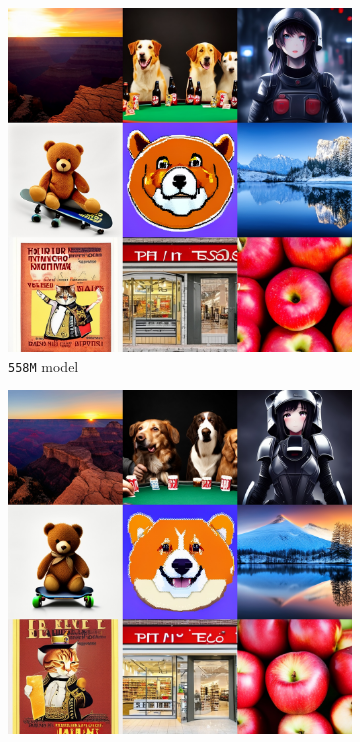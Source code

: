 \begin{figure}[htbp]
    \begin{subfigure}[b]{0.32\textwidth}
    \centering
    \includegraphics[width=\textwidth]{cp2/figures/t2i/c256.jpg}
    \caption{\texttt{558M} model}
    \end{subfigure}
    \begin{subfigure}[b]{0.32\textwidth}
    \centering
    \includegraphics[width=\textwidth]{cp2/figures/t2i/c320.jpg}

\end{subfigure}
\end{figure}
